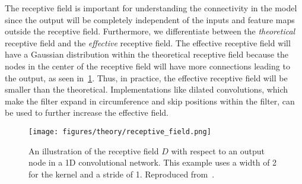 The receptive field is important for understanding the connectivity in the model since the output will be completely independent of the inputs and feature maps outside the receptive field. Furthermore, we differentiate between the \textit{theoretical}
receptive field and the \textit{effective} receptive field. The effective receptive field
will have a Gaussian distribution within the theoretical receptive field because the nodes in the center of the receptive field will have more connections leading to the output, as seen in~\cref{fig:receptive_field}. Thus, in practice, the effective receptive field will be smaller than the theoretical. Implementations like dilated convolutions, which make the filter expand in circumference and skip positions within the filter, can be used to further increase the effective field.

\begin{figure}[!htb]
  \centering
  \texttt{[image: figures/theory/receptive\_field.png]}
  \caption{An illustration of the receptive field $D$ with respect to an output node in a 1D convolutional network. This example uses a width of 2 for the kernel and a stride of 1. Reproduced from~\cite{receptive_field_1D}.}
  \label{fig:receptive_field}
\end{figure}


